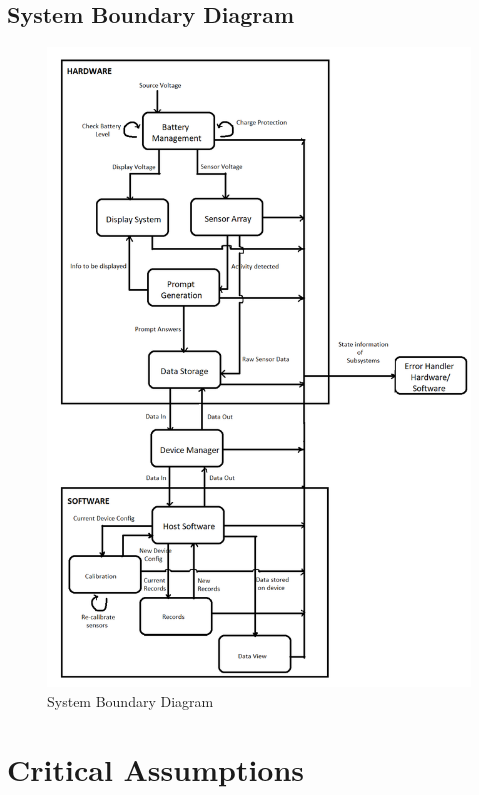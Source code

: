 \documentclass{article}
\begin{document}
	\subsection{System Boundary Diagram}
		\begin{figure}
			\begin{center}
				 \includegraphics[width=1.0\textwidth]{SystemBoundaryDiagram}
				\caption{System Boundary Diagram}
				\label{Fig_SBD} 
			\end{center}
		\end{figure}	
\pagebreak
	 
\section{Critical Assumptions }
\end{document}
